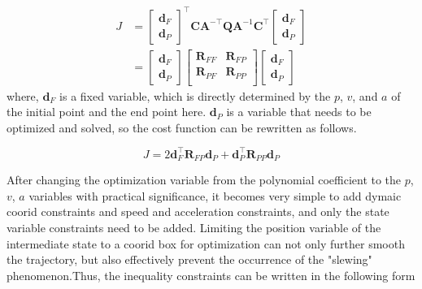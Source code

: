 \documentclass[conference]{IEEEtran}
\begin{document}
    \begin{equation}
        \begin{aligned}
            J &= 
            \begin{bmatrix}
            \boldsymbol{d}_{F} \\
            \boldsymbol{d}_{P{}}
            \end{bmatrix} ^{\top}
            \boldsymbol{C}\boldsymbol{A}^{-\top}
            \boldsymbol{Q} \boldsymbol{A}^{-1}
            \boldsymbol{C}^{\top}
            \begin{bmatrix}
            \boldsymbol{d}_{F} \\
            \boldsymbol{d}_{P}
            \end{bmatrix} \\
            &=
            \begin{bmatrix}
            \boldsymbol{d}_{F} \\
            \boldsymbol{d}_{P}
            \end{bmatrix}
            \begin{bmatrix}
            \boldsymbol{R}_{FF} &\boldsymbol{R}_{FP}\\
            \boldsymbol{R}_{PF} &\boldsymbol{R}_{PP}\\
            \end{bmatrix}
            \begin{bmatrix}
            \boldsymbol{d}_{F} \\
            \boldsymbol{d}_{P}
            \end{bmatrix}
        \end{aligned}
    \end{equation}
    where, $\boldsymbol{d}_{F}$ is a fixed variable, which is directly determined by the $p$, $v$, and $a$ of the initial point and the end point here. $\boldsymbol{d}_{P}$ is a variable that needs to be optimized and solved, so the cost function can be rewritten as follows.

    \begin{equation}
        J = 2\boldsymbol{d}_{F}^{\top}\boldsymbol{R}_{FP}\boldsymbol{d}_{P} + \boldsymbol{d}_{P}^{\top}\boldsymbol{R}_{PP}\boldsymbol{d}_{P} 
    \end{equation}

    After changing the optimization variable from the polynomial coefficient to the $p$, $v$, $a$ variables with practical significance, it becomes very simple to add dymaic coorid constraints and speed and acceleration constraints, and only the state variable constraints need to be added. Limiting the position variable of the intermediate state to a coorid box for optimization can not only further smooth the trajectory, but also effectively prevent the occurrence of the "slewing" phenomenon.Thus, the inequality constraints can be written in the following form
\end{document}
